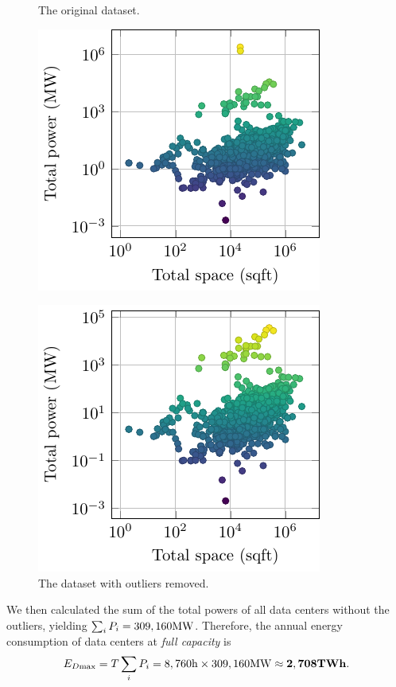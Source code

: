 \documentclass[12pt]{article}
\begin{document}
\begin{figure}[!t]
	\centering
	\begin{minipage}{0.48\textwidth}
		\centering
		\caption{The original dataset.}
		\label{fig_data_datacenters_original}
		\includegraphics{figures/data/datacenters.pdf}
	\end{minipage}
	\hfill
	\begin{minipage}{0.48\textwidth}
		\centering
		\caption{The dataset with outliers removed.}
		\label{fig_data_datacenters_clean}
		\includegraphics{figures/data/datacenters_clean.pdf}
	\end{minipage}
\end{figure}

We then calculated the sum of the total powers of all data centers without the outliers, yielding $\sum_i P_i = 309,160 \rm MW$. Therefore, the annual energy consumption of data centers at \textit{full capacity} is
\begin{equation}
	E_{D \rm max} = T \sum_i P_i =
	\rm 8,760h \times 309,160MW \approx \mathbf{2,708TWh}.
\end{equation}
\end{document}
